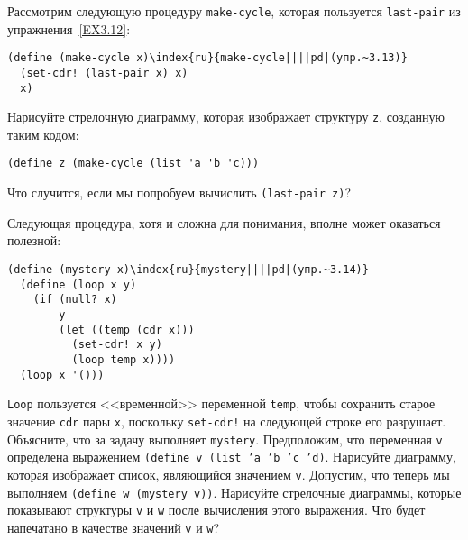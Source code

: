 \begin{exercise}{3.13}\label{EX3.13}%
%
%
Рассмотрим следующую процедуру {\tt make-cycle},
которая пользуется {\tt last-pair} из
упражнения~\ref{EX3.12}:

\begin{Verbatim}[fontsize=\small]
(define (make-cycle x)\index{ru}{make-cycle||||pd|(упр.~3.13)}
  (set-cdr! (last-pair x) x)
  x)
\end{Verbatim}
Нарисуйте  стрелочную диаграмму, которая изображает
структуру {\tt z}, созданную таким кодом:

\begin{Verbatim}[fontsize=\small]
(define z (make-cycle (list 'a 'b 'c)))
\end{Verbatim}
Что случится, если мы попробуем вычислить
{\tt (last-pair z)}?
\end{exercise}
\begin{exercise}{3.14}\label{EX3.14}%
Следующая процедура, хотя и сложна для понимания, вполне
может оказаться полезной:

\begin{Verbatim}[fontsize=\small]
(define (mystery x)\index{ru}{mystery||||pd|(упр.~3.14)}
  (define (loop x y)
    (if (null? x)
        y
        (let ((temp (cdr x)))
          (set-cdr! x y)
          (loop temp x))))
  (loop x '()))
\end{Verbatim}
{\tt Loop} пользуется <<временной>> переменной
{\tt temp}, чтобы сохранить старое значение
{\tt cdr} пары {\tt x}, поскольку
{\tt set-cdr!} на следующей строке его разрушает.  Объясните,
что за задачу выполняет {\tt mystery}.  Предположим, что
переменная {\tt v} определена выражением {\tt (define v (list
'a 'b 'c 'd)}.  Нарисуйте диаграмму, которая изображает список,
являющийся значением {\tt v}.  Допустим, что теперь мы
выполняем {\tt (define w (mystery v))}. Нарисуйте стрелочные диаграммы,
которые показывают структуры {\tt v} и
{\tt w} после вычисления этого выражения.  Что будет напечатано
в качестве значений {\tt v} и {\tt w}?
\end{exercise}


\begin{cntrfig}

\caption{Список {\tt z1}, порождаемый
выражением {\tt (cons x x)}.}
\label{P3.16}

\end{cntrfig}


\begin{cntrfig}

\caption{Список z2, порождаемый выражением
{\tt (cons (list 'a 'b) (list 'a 'b))}.}
\label{P3.17}

\end{cntrfig}

